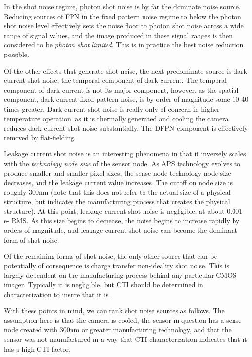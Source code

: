 \documentclass[10pt]{article}
\begin{document}
In the shot noise regime, photon shot noise is by far the dominate noise source. Reducing sources of FPN in the fixed pattern noise regime to below the photon shot noise level effectively sets the noise floor to photon shot noise across a wide range of signal values, and the image produced in those signal ranges is then considered to be \emph{photon shot limited}. This is in practice the best noise reduction possible. 

Of the other effects that generate shot noise, the next predominate source is dark current shot noise, the temporal component of dark current. The temporal component of dark current is not its major component, however, as the spatial component, dark current fixed pattern noise, is by order of magnitude some 10-40 times greater. Dark current shot noise is really only of concern in higher temperature operation, as it is thermally generated and cooling the camera reduces dark current shot noise substantially. The DFPN component is effectively removed by flat-fielding. 

Leakage current shot noise is an interesting phenomena in that it inversely scales with the \emph{technology node size} of the sensor node. As APS technology evolves to produce smaller and smaller pixel sizes, the sense node technology node size decreases, and the leakage current value increases. The cutoff on node size is roughly 300nm (note that this does not refer to the actual size of a physical structure, but indicates the manufacturing process that creates the physical structure). At this point, leakage current shot noise is negligible, at about 0.001 e- RMS. As this size begins to decrease, the noise begins to increase rapidly by orders of magnitude, and leakage current shot noise can become the dominant form of shot noise.

Of the remaining forms of shot noise, the only other source that can be potentially of consequence is charge transfer non-ideality shot noise. This is largely dependent on the manufacturing process behind any particular CMOS imager. Typically it is negligible, but CTI should be determined in characterization to insure that it is. 

With these points in mind, we can rank shot noise sources as follows. The assumption here is that the camera is cooled, the sensor in question has a sense node created with 300nm or greater manufacturing technology, and that the sensor was not manufactured in a way that CTI characterization indicates that it has a high CTI factor.
\end{document}
